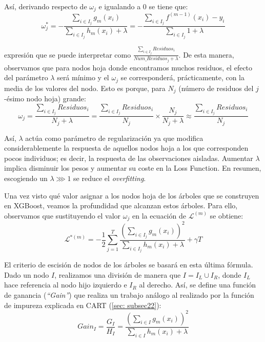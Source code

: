 \documentclass[12pt,twoside]{article}
\begin{document}
Así, derivando respecto de $\omega_j$ e igualando a 0 se tiene que:
\begin{equation*}
\omega_j^* = - \frac{\sum_{i \in I_j} g_m(x_i)}{\sum_{i \in I_j} h_m(x_i) + \lambda} = - \frac{\sum_{i \in I_j} f^{(m-1)}(x_i) - y_i}{\sum_{i \in I_j} 1 + \lambda}
\end{equation*}

\noindent
expresión que se puede interpretar como $\frac{\sum_{i \in I_j} Residuos_i}{Num\_Residuos_j + \lambda}$. De esta manera, observamos que para nodos hoja donde encontramos muchos residuos, el efecto del parámetro $\lambda$ será mínimo y el $\omega_j$ se corresponderá, prácticamente, con la media de los valores del nodo. Esto es porque, para $N_j$ (número de residuos del $j$-ésimo nodo hoja) grande:
\begin{equation*}
\omega_j = \frac{\sum_{i \in I_j} Residuos_i}{N_j + \lambda} = \frac{\sum_{i \in I_j} Residuos_i}{N_j} \times \frac{N_j}{N_j + \lambda} \approx \frac{\sum_{i \in I_j} Residuos_i}{N_j}
\end{equation*}

Así, $\lambda$ actúa como parámetro de regularización ya que modifica considerablemente la respuesta de aquellos nodos hoja a los que corresponden pocos individuos; es decir, la respuesta de las observaciones aisladas. Aumentar $\lambda$ implica disminuir los pesos y aumentar su coste en la Loss Function. En resumen, escogiendo un $\lambda \ggg 1$ se reduce el \textit{overfitting}.

Una vez visto qué valor asignar a los nodos hoja de los árboles que se construyen en XGBoost, veamos la profundidad que alcanzan estos árboles. Para ello, observamos que sustituyendo el valor $\omega_j$ en la ecuación de $\mathcal{L}^{(m)}$ se obtiene:
\begin{equation*}
\mathcal{L}^{*(m)} = - \frac{1}{2} \sum_{j = 1}^T \frac{\left( \sum_{i \in I_j} g_m(x_i) \right)^2}{\sum_{i \in I_j} h_m(x_i) + \lambda} + \gamma T 
\end{equation*}

El criterio de escisión de nodos de los árboles se basará en esta última fórmula. Dado un nodo $I$, realizamos una división de manera que $I = I_L \cup I_R$, donde $I_L$ hace referencia al nodo hijo izquierdo e $I_R$ al derecho. Así, se define una función de ganancia (\textit{``Gain''}) que realiza un trabajo análogo al realizado por la función de impureza explicada en CART (\ref{sec: subsec22}):
\begin{equation*}
Gain_I = \frac{G_I}{H_I} = \frac{\left( \sum_{i \in I} g_m(x_i) \right)^2}{\sum_{i \in I} h_m(x_i) + \lambda}
\end{equation*}
\end{document}
